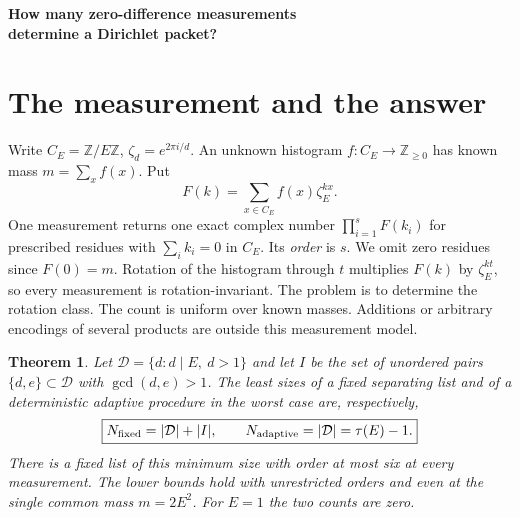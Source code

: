 \documentclass[11pt,letterpaper]{article}
\newtheorem{theorem}{Theorem}\newtheorem{lemma}[theorem]{Lemma}\newtheorem{corollary}[theorem]{Corollary}\newtheorem{proposition}[theorem]{Proposition}
\newcommand{\Z}{\mathbb Z}\newcommand{\Q}{\mathbb Q}\newcommand{\C}{\mathbb C}
\newcommand{\D}{\mathcal D}\newcommand{\U}{\mathcal U}
\begin{document}
\thispagestyle{plain}
\begin{center}\vspace{3pt}
{\LARGE\bfseries How many zero-difference measurements\\[2pt] determine a Dirichlet packet?}
\end{center}
\begin{abstract}
At an unramified prime, the twists in a product of Dirichlet $L$-functions give a histogram on a cyclic group of order $E$. Differences of zero ordinates give access to balanced products of its Fourier coefficients. For a histogram of known mass, we determine the exact worst-case number of individual complex products needed to recover it up to rotation. A fixed list needs one product per nontrivial divisor of $E$ and one per pair of those divisors with a common prime factor. Our list attains this minimum using measurements of order at most six, and also minimizes the maximum order. Adaptive measurements need exactly one per nontrivial divisor. Every lower-bound example can occur in a family of primitive Dirichlet characters.
\end{abstract}

\section{The measurement and the answer}
Write $C_E=\Z/E\Z$, $\zeta_d=e^{2\pi i/d}$. An unknown histogram $f:C_E\to\Z_{\ge0}$ has known mass $m=\sum_x f(x)$. Put
\[
 F(k)=\sum_{x\in C_E} f(x)\zeta_E^{kx}.
\]
One measurement returns one exact complex number $\prod_{i=1}^s F(k_i)$ for prescribed residues with $\sum_i k_i=0$ in $C_E$. Its \emph{order} is $s$. We omit zero residues since $F(0)=m$. Rotation of the histogram through $t$ multiplies $F(k)$ by $\zeta_E^{kt}$, so every measurement is rotation-invariant. The problem is to determine the rotation class. The count is uniform over known masses. Additions or arbitrary encodings of several products are outside this measurement model.

\begin{theorem}\label{th:main}
Let $\D=\{d:d\mid E,\ d>1\}$ and let $I$ be the set of unordered pairs $\{d,e\}\subset\D$ with $\gcd(d,e)>1$. The least sizes of a fixed separating list and of a deterministic adaptive procedure in the worst case are, respectively,
\[
 \boxed{N_{\rm fixed}=|\D|+|I|,\qquad N_{\rm adaptive}=|\D|=\tau(E)-1.}
\]
There is a fixed list of this minimum size with order at most six at every measurement. The lower bounds hold with unrestricted orders and even at the single common mass $m=2E^2$. For $E=1$ the two counts are zero.
\end{theorem}
\end{document}
